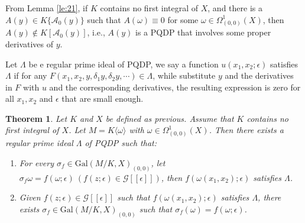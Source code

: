 \documentclass[preprint, 12pt]{elsarticle}
\newtheorem{thm}{Theorem}[section]
\numberwithin{equation}{section}
\newcommand{\A}{\mathcal{A}}
\newcommand{\G}{\mathcal{G}}
\newcommand{\Gal}{\mathrm{Gal}}
\newcommand{\CA}{\G[[\epsilon]]}
\begin{document}
From Lemma \ref{le:21}, if $K$ contains no first integral of $X$,
and there is a $A(y)\in K\{\A_0(y)\}$ such that $A(\omega) \equiv 0$ for some
$\omega\in \Omega_{(0,0)}^1(X)$, then $A(y)\not\in K[\A_0(y)]$, i.e., $A(y)$ is a PQDP that involves some proper derivatives of $y$.

Let $\Lambda$ be e regular prime ideal of PQDP, we say a function $u(x_1,x_2;\epsilon)$ satisfies $\Lambda$ if for any
$F(x_1,x_2,y,\delta_1y, \delta_2y,\cdots)\in \Lambda$, while
substitute $y$ and the derivatives in $F$ with $u$ and the
corresponding derivatives, the resulting expression is zero for
all $x_1, x_2$ and $\epsilon$ that are small enough.

\begin{thm}
\label{th:3} Let $K$ and $X$ be defined as previous. Assume that $K$ contains no
first integral of $X$. Let $M = K\langle \omega\rangle$ with
$\omega\in \Omega_{(0,0)}^1(X)$. Then there exists a regular prime
ideal $\Lambda$ of PQDP such that:
\begin{enumerate}
  \item[(1).] For every $\sigma_f\in \Gal(M/K,X)_{(0,0)}$, let $\sigma_f\omega = f(\omega;\epsilon)\ (f(z;\epsilon)\in \G[[\epsilon]])$, then
$f(\omega(x_1,x_2);\epsilon)$ satisfies $\Lambda$.
  \item[(2).] Given $f(z;\epsilon)\in \CA$ such that $f(\omega(x_1,x_2);\epsilon)$ satisfies $\Lambda$,
  there exists $\sigma_f\in \Gal(M/K,X)_{(0,0)}$ such that $\sigma_f(\omega) = f(\omega;\epsilon)$.
\end{enumerate}
\end{thm}
\end{document}

